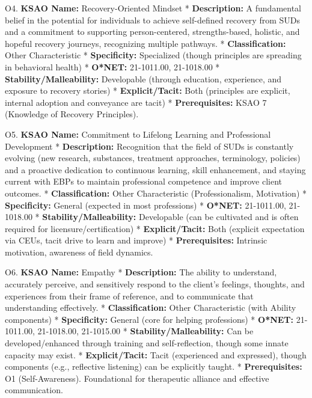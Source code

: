 \documentclass[
  letterpaper,
  DIV=11,
  numbers=noendperiod]{scrartcl}
\begin{document}
O4. \textbf{KSAO Name:} Recovery-Oriented Mindset *
\textbf{Description:} A fundamental belief in the potential for
individuals to achieve self-defined recovery from SUDs and a commitment
to supporting person-centered, strengths-based, holistic, and hopeful
recovery journeys, recognizing multiple pathways. *
\textbf{Classification:} Other Characteristic * \textbf{Specificity:}
Specialized (though principles are spreading in behavioral health) *
\textbf{O*NET:} 21-1011.00, 21-1018.00 *
\textbf{Stability/Malleability:} Developable (through education,
experience, and exposure to recovery stories) * \textbf{Explicit/Tacit:}
Both (principles are explicit, internal adoption and conveyance are
tacit) * \textbf{Prerequisites:} KSAO 7 (Knowledge of Recovery
Principles).

O5. \textbf{KSAO Name:} Commitment to Lifelong Learning and Professional
Development * \textbf{Description:} Recognition that the field of SUDs
is constantly evolving (new research, substances, treatment approaches,
terminology, policies) and a proactive dedication to continuous
learning, skill enhancement, and staying current with EBPs to maintain
professional competence and improve client outcomes. *
\textbf{Classification:} Other Characteristic (Professionalism,
Motivation) * \textbf{Specificity:} General (expected in most
professions) * \textbf{O*NET:} 21-1011.00, 21-1018.00 *
\textbf{Stability/Malleability:} Developable (can be cultivated and is
often required for licensure/certification) * \textbf{Explicit/Tacit:}
Both (explicit expectation via CEUs, tacit drive to learn and improve) *
\textbf{Prerequisites:} Intrinsic motivation, awareness of field
dynamics.

O6. \textbf{KSAO Name:} Empathy * \textbf{Description:} The ability to
understand, accurately perceive, and sensitively respond to the client's
feelings, thoughts, and experiences from their frame of reference, and
to communicate that understanding effectively. *
\textbf{Classification:} Other Characteristic (with Ability components)
* \textbf{Specificity:} General (core for helping professions) *
\textbf{O*NET:} 21-1011.00, 21-1018.00, 21-1015.00 *
\textbf{Stability/Malleability:} Can be developed/enhanced through
training and self-reflection, though some innate capacity may exist. *
\textbf{Explicit/Tacit:} Tacit (experienced and expressed), though
components (e.g., reflective listening) can be explicitly taught. *
\textbf{Prerequisites:} O1 (Self-Awareness). Foundational for
therapeutic alliance and effective communication.
\end{document}
